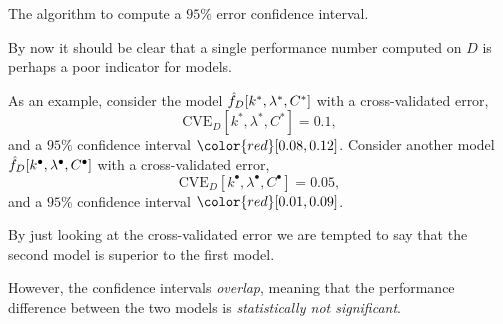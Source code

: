 \documentclass[a4paper,blends,pdf,colorBG,slideColor]{prosper}
\begin{document}
\vspace{.2in}
\begin{center}
The algorithm to compute a $95\%$ error confidence interval.
\end{center}
\es

By now it should be clear that a single performance number computed on $D$ is perhaps a poor
indicator for models.

As an example, consider the model $\hat{f}_D[k^*,\lambda^*,C^*]$ with a cross-validated error,
\begin{equation*}
\text{CVE}_D[k^*,\lambda^*,C^*] = 0.1,
\end{equation*}
and a $95\%$ confidence interval ${\color{red}[0.08,0.12]}$.
Consider another model $\hat{f}_D[k^\bullet,\lambda^\bullet,C^\bullet]$ with a cross-validated error,
\begin{equation*}
\text{CVE}_D[k^\bullet,\lambda^\bullet,C^\bullet] = 0.05,
\end{equation*}
and a $95\%$ confidence interval ${\color{red}[0.01,0.09]}$.  

By just looking at the cross-validated error we are tempted to say that the second model is
superior to the first model.

However, the confidence intervals {\em overlap}, meaning that the performance difference between
the two models is {\em statistically not significant}.
\es
\end{document}
